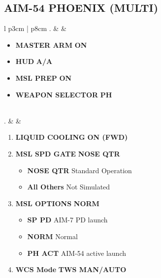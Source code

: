 \documentclass[8pt,usenames,dvipsnames,twoside]{article}
\begin{document}
		\subsection{AIM-54 PHOENIX (MULTI)}
		\begin{center}
			\begin{tabular}{l p{3cm} | p{8cm}}
				. &  & 
				\begin{minipage}[t]{\linewidth}
					\vspace{-7pt}
					\begin{itemize}
						\item \textbf{MASTER ARM} \dotfill \textbf{ON}
						\item \textbf{HUD} \dotfill \textbf{A/A}
						\item \textbf{MSL PREP} \dotfill \textbf{ON}
						\item \textbf{WEAPON SELECTOR} \dotfill \textbf{PH}
					\end{itemize} 
				\end{minipage} \\
				. &  & 
				\begin{minipage}[t]{\linewidth}
					\vspace{-7pt}
					\begin{enumerate}[label=(\alph*)]
						\item \textbf{LIQUID COOLING} \dotfill \textbf{ON (FWD)}
						\item \textbf{MSL SPD GATE} \dotfill \textbf{NOSE QTR}
						\begin{itemize}
							\item \textbf{NOSE QTR} Standard Operation
							\item \textbf{All Others} Not Simulated
						\end{itemize}
						\item \textbf{MSL OPTIONS} \dotfill \textbf{NORM}
						\begin{itemize}
							\item \textbf{SP PD} AIM-7 PD launch
							\item \textbf{NORM} Normal
							\item \textbf{PH ACT} AIM-54 active launch
						\end{itemize}
						\item \textbf{WCS Mode} \dotfill \textbf{TWS MAN/AUTO}
					\end{enumerate}
				\end{minipage} \\
				\midrule

\end{tabular}
\end{center}
\end{document}
